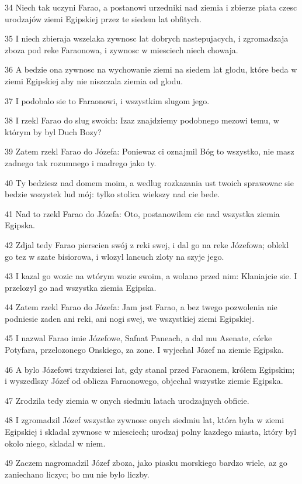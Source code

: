 \par 34 Niech tak uczyni Farao, a postanowi urzedniki nad ziemia i zbierze piata czesc urodzajów ziemi Egipskiej przez te siedem lat obfitych.
\par 35 I niech zbieraja wszelaka zywnosc lat dobrych nastepujacych, i zgromadzaja zboza pod reke Faraonowa, i zywnosc w miesciech niech chowaja.
\par 36 A bedzie ona zywnosc na wychowanie ziemi na siedem lat glodu, które beda w ziemi Egipskiej aby nie niszczala ziemia od glodu.
\par 37 I podobalo sie to Faraonowi, i wszystkim slugom jego.
\par 38 I rzekl Farao do slug swoich: Izaz znajdziemy podobnego mezowi temu, w którym by byl Duch Bozy?
\par 39 Zatem rzekl Farao do Józefa: Poniewaz ci oznajmil Bóg to wszystko, nie masz zadnego tak rozumnego i madrego jako ty.
\par 40 Ty bedziesz nad domem moim, a wedlug rozkazania ust twoich sprawowac sie bedzie wszystek lud mój: tylko stolica wiekszy nad cie bede.
\par 41 Nad to rzekl Farao do Józefa: Oto, postanowilem cie nad wszystka ziemia Egipska.
\par 42 Zdjal tedy Farao pierscien swój z reki swej, i dal go na reke Józefowa; oblekl go tez w szate bisiorowa, i wlozyl lancuch zloty na szyje jego.
\par 43 I kazal go wozic na wtórym wozie swoim, a wolano przed nim: Klaniajcie sie. I przelozyl go nad wszystka ziemia Egipska.
\par 44 Zatem rzekl Farao do Józefa: Jam jest Farao, a bez twego pozwolenia nie podniesie zaden ani reki, ani nogi swej, we wszystkiej ziemi Egipskiej.
\par 45 I nazwal Farao imie Józefowe, Safnat Paneach, a dal mu Asenate, córke Potyfara, przelozonego Onskiego, za zone. I wyjechal Józef na ziemie Egipska.
\par 46 A bylo Józefowi trzydziesci lat, gdy stanal przed Faraonem, królem Egipskim; i wyszedlszy Józef od oblicza Faraonowego, objechal wszystke ziemie Egipska.
\par 47 Zrodzila tedy ziemia w onych siedmiu latach urodzajnych obficie.
\par 48 I zgromadzil Józef wszystke zywnosc onych siedmiu lat, która byla w ziemi Egipskiej i skladal zywnosc w miesciech; urodzaj polny kazdego miasta, który byl okolo niego, skladal w niem.
\par 49 Zaczem nagromadzil Józef zboza, jako piasku morskiego bardzo wiele, az go zaniechano liczyc; bo mu nie bylo liczby.
